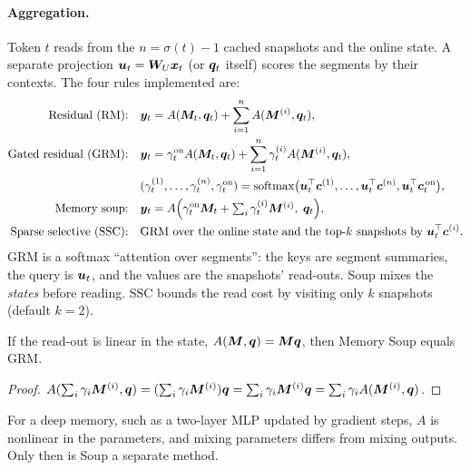 \paragraph{Aggregation.} Token $t$ reads from the $n=\sigma(t)-1$ cached snapshots and the online
state. A separate projection $\bm{u}_t=\bm{W}_U\bm{x}_t$ (or $\bm{q}_t$ itself) scores the segments by their
contexts. The four rules implemented are:
\begin{align}
  \text{Residual (RM):}\quad &\bm{y}_t = A(\bm{M}_t,\bm{q}_t)+\sum_{i=1}^{n}A(\bm{M}^{(i)},\bm{q}_t),\label{eq:c13-mc-rm}\\
  \text{Gated residual (GRM):}\quad &\bm{y}_t = \gamma^{\mathrm{on}}_tA(\bm{M}_t,\bm{q}_t)+\sum_{i=1}^{n}\gamma^{(i)}_tA(\bm{M}^{(i)},\bm{q}_t),\label{eq:c13-mc-grm}\\
  &(\gamma^{(1)}_t,\dots,\gamma^{(n)}_t,\gamma^{\mathrm{on}}_t)=\operatorname{softmax}\bigl(\bm{u}_t^{\top}\bm{c}^{(1)},\dots,\bm{u}_t^{\top}\bm{c}^{(n)},\bm{u}_t^{\top}\bm{c}^{\,\mathrm{on}}_t\bigr),\nonumber\\
  \text{Memory soup:}\quad &\bm{y}_t = A\Bigl(\gamma^{\mathrm{on}}_t\bm{M}_t+\textstyle\sum_{i}\gamma^{(i)}_t\bm{M}^{(i)},\;\bm{q}_t\Bigr),\label{eq:c13-mc-soup}\\
  \text{Sparse selective (SSC):}\quad &\text{GRM over the online state and the top-}k\text{ snapshots by }\bm{u}_t^{\top}\bm{c}^{(i)}.\label{eq:c13-mc-ssc}
\end{align}
GRM is a softmax ``attention over segments'': the keys are segment summaries, the query is $\bm{u}_t$, and
the values are the snapshots' read-outs. Soup mixes the \emph{states} before reading. SSC bounds the
read cost by visiting only $k$ snapshots (default $k=2$).

\begin{proposition}\label{prop:c13-soup}
If the read-out is linear in the state, $A(\bm{M},\bm{q})=\bm{M}\bm{q}$, then Memory Soup equals GRM.
\end{proposition}
\begin{proof}
$A(\sum_i\gamma_i\bm{M}^{(i)},\bm{q})=(\sum_i\gamma_i\bm{M}^{(i)})\bm{q}=\sum_i\gamma_i\bm{M}^{(i)}\bm{q}=\sum_i\gamma_iA(\bm{M}^{(i)},\bm{q})$.
\end{proof}
For a deep memory, such as a two-layer MLP updated by gradient steps, $A$ is nonlinear in the
parameters, and mixing parameters differs from mixing outputs. Only then is Soup a separate method.


